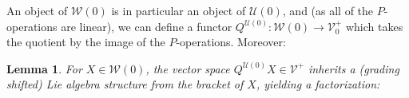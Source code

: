\documentclass[11pt]{amsart} \renewcommand{\baselinestretch}{1.2}
\theoremstyle{plain}
\newtheorem{lem}[thm]{Lemma}
\numberwithin{equation}{section} %
\theoremstyle{plain}
\newtheorem{lem}[thm]{Lemma}
\numberwithin{equation}{chapter} %
\renewcommand{\to}{\longrightarrow}
\newcommand{\scrL}{\mathscr{L}}
\newcommand{\calU}{\mathcal{U}}
\newcommand{\calP}{\mathcal{P}}
\newcommand{\calL}{\mathcal{L}}
\newcommand{\calV}{\mathcal{V}}
\newcommand{\calw}{\mathcal{W}}
\newcommand{\citeBOX}[2][]{\cite[\mbox{#1}]{#2}}
\newcommand{\Palg}{{\calP}}
\newcommand{\LieOperad}{{\scrL}}
\newcommand{\vect}[2]{\calV^{#1}_{#2}}
\newcommand{\F}{\mathbb{F}}
\newcommand{\Id}{\mathrm{id}}
\newcommand{\Ftwo}{\F_2}
\begin{document}
\begin{Constructing cohomology operations}
An object of $\calw(0)$ is in particular an object of $\calU(0)$, and (as all of the $P$-operations are linear), we can define a functor $Q^{\calU(0)}:\calw(0)\to\vect{+}{0}$ which takes the quotient by the image of the $P$-operations. Moreover:
\begin{lem}
\label{Kill P ops gives lie alg}
For $X\in\calw(0)$, the vector space $Q^{\calU(0)}X\in\vect{+}{}$ inherits a (grading shifted) Lie algebra structure from the bracket of $X$, yielding a factorization:%

\end{lem}
\end{Constructing cohomology operations}
\end{document}

